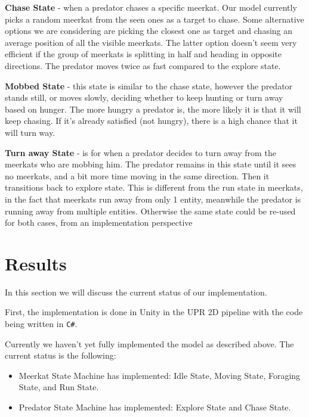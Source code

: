 \documentclass[9pt,twoside]{pnas-new}
\begin{document}
\textbf{Chase State} - when a predator chases a specific meerkat.
Our model currently picks a random meerkat from the seen ones as a target to chase. Some alternative options we are considering are picking the closest one as target and chasing an average position of all the visible meerkats. The latter option doesn't seem very efficient if the group of meerkats is splitting in half and heading in opposite directions.
The predator moves twice as fast compared to the explore state.

\textbf{Mobbed State} - this state is similar to the chase state, however the predator stands still, or moves slowly, deciding whether to keep hunting or turn away based on hunger. The more hungry a predator is, the more likely it is that it will keep chasing. If it's already satisfied (not hungry), there is a high chance that it will turn way.

\textbf{Turn away State} - is for when a predator decides to turn away from the meerkats who are mobbing him. The predator remains in this state until it sees no meerkats, and a bit more time moving in the same direction. Then it transitions back to explore state. 
This is different from the run state in meerkats, in the fact that meerkats run away from only 1 entity, meanwhile the predator is running away from multiple entities. 
Otherwise the same state could be re-used for both cases, from an implementation perspective





\section{Results}
\label{results}
In this section we will discuss the current status of our implementation.

First, the implementation is done in Unity in the UPR 2D pipeline with the code being written in \verb|C#|.

Currently we haven't yet fully implemented the model as described above. The current status is the following:
\begin{itemize}
    \item [-] Meerkat State Machine has implemented: Idle State, Moving State, Foraging State, and Run State.
    \item [-] Predator State Machine has implemented: Explore State and Chase State.
\end{itemize}
\end{document}
